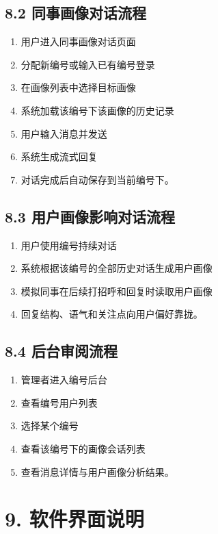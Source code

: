 \documentclass[12pt,a4paper]{article}
\begin{document}
\subsection*{8.2 同事画像对话流程}
\vspace{0.45em}
\begin{enumerate}
\item 用户进入同事画像对话页面
\item 分配新编号或输入已有编号登录
\item 在画像列表中选择目标画像
\item 系统加载该编号下该画像的历史记录
\item 用户输入消息并发送
\item 系统生成流式回复
\item 对话完成后自动保存到当前编号下。
\end{enumerate}
\vspace{0.45em}
\subsection*{8.3 用户画像影响对话流程}
\vspace{0.45em}
\begin{enumerate}
\item 用户使用编号持续对话
\item 系统根据该编号的全部历史对话生成用户画像
\item 模拟同事在后续打招呼和回复时读取用户画像
\item 回复结构、语气和关注点向用户偏好靠拢。
\end{enumerate}
\vspace{0.45em}
\subsection*{8.4 后台审阅流程}
\vspace{0.45em}
\begin{enumerate}
\item 管理者进入编号后台
\item 查看编号用户列表
\item 选择某个编号
\item 查看该编号下的画像会话列表
\item 查看消息详情与用户画像分析结果。
\end{enumerate}
\vspace{0.45em}
\section*{9. 软件界面说明}
\vspace{0.45em}
\newpage
{}
\fancyhead[R]{}
\end{document}
